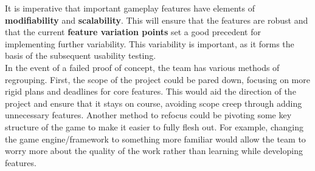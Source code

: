 \noindent It is imperative that important gameplay features have elements of \textbf{modifiability} and \textbf{scalability}. This will ensure that the features are robust and that the current \textbf{feature variation points} set a good precedent for implementing further variability. This variability is important, as it forms the basis of the subsequent usability testing.
\\

\noindent In the event of a failed proof of concept, the team has various methods of regrouping. First, the scope of the project could be pared down, focusing on more rigid plans and deadlines for core features. This would aid the direction of the project and ensure that it stays on course, avoiding scope creep through adding unnecessary features. Another method to refocus could be pivoting some key structure of the game to make it easier to fully flesh out. For example, changing the game engine/framework to something more familiar would allow the team to worry more about the quality of the work rather than learning while developing features. 


%
